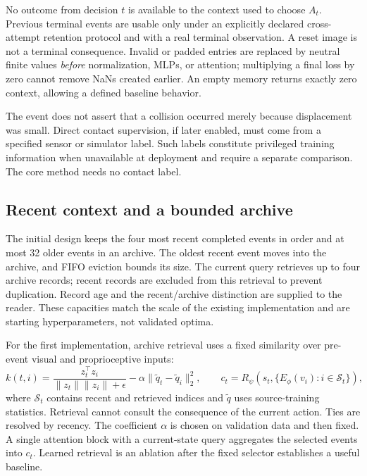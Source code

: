 \documentclass[10pt,letterpaper]{article}
\begin{document}
No outcome from decision $t$ is available to the context used to choose $A_t$. Previous terminal events are usable only under an explicitly declared cross-attempt retention protocol and with a real terminal observation. A reset image is not a terminal consequence. Invalid or padded entries are replaced by neutral finite values \emph{before} normalization, MLPs, or attention; multiplying a final loss by zero cannot remove NaNs created earlier. An empty memory returns exactly zero context, allowing a defined baseline behavior.

The event does not assert that a collision occurred merely because displacement was small. Direct contact supervision, if later enabled, must come from a specified sensor or simulator label. Such labels constitute privileged training information when unavailable at deployment and require a separate comparison. The core method needs no contact label.

\subsection{Recent context and a bounded archive}
The initial design keeps the four most recent completed events in order and at most 32 older events in an archive. The oldest recent event moves into the archive, and FIFO eviction bounds its size. The current query retrieves up to four archive records; recent records are excluded from this retrieval to prevent duplication. Record age and the recent/archive distinction are supplied to the reader. These capacities match the scale of the existing implementation and are starting hyperparameters, not validated optima.

For the first implementation, archive retrieval uses a fixed similarity over pre-event visual and proprioceptive inputs:
\begin{equation}
 k(t,i)=\frac{z_t^\top z_i}{\|z_t\|\|z_i\|+\epsilon}
            -\alpha\|\widetilde q_t-\widetilde q_i\|_2^2,
 \qquad
 c_t=R_\psi\left(s_t,\{E_\phi(v_i):i\in\mathcal{S}_t\}\right),
 \label{eq:reader}
\end{equation}
where $\mathcal{S}_t$ contains recent and retrieved indices and $\widetilde q$ uses source-training statistics. Retrieval cannot consult the consequence of the current action. Ties are resolved by recency. The coefficient $\alpha$ is chosen on validation data and then fixed. A single attention block with a current-state query aggregates the selected events into $c_t$. Learned retrieval is an ablation after the fixed selector establishes a useful baseline.
\end{document}
